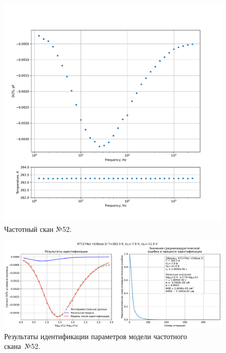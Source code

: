 \begin{figure}[!ht]
    \centering
    \includegraphics[width=1\textwidth]{../plots/КТ117№1_п1(база 2)_2500Гц-1Гц_1пФ_-10С_-7В-11В_50мВ_20мкс_шаг_0,1.pdf}
    \caption{Частотный скан №52.}
    \label{pic:frequency_scan_52}
\end{figure}

\begin{figure}[!ht]
    \centering
    \includegraphics[width=1\textwidth]{../plots/КТ117№1_п1(база 2)_2500Гц-1Гц_1пФ_-10С_-7В-11В_50мВ_20мкс_шаг_0,1_model.pdf}
    \caption{Результаты идентификации параметров модели частотного скана~№52.}
    \label{pic:frequency_scan_model52}
\end{figure}

\pagebreak


